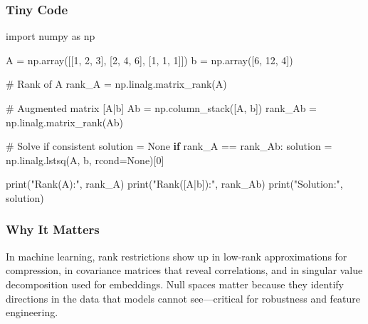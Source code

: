 \documentclass[
  letterpaper,
  DIV=11,
  numbers=noendperiod]{scrreprt}
\newenvironment{Shaded}{\begin{snugshade}}{\end{snugshade}}
\newcommand{\BuiltInTok}[1]{\textcolor[rgb]{0.00,0.23,0.31}{#1}}
\newcommand{\CommentTok}[1]{\textcolor[rgb]{0.37,0.37,0.37}{#1}}
\newcommand{\ControlFlowTok}[1]{\textcolor[rgb]{0.00,0.23,0.31}{\textbf{#1}}}
\newcommand{\DecValTok}[1]{\textcolor[rgb]{0.68,0.00,0.00}{#1}}
\newcommand{\ImportTok}[1]{\textcolor[rgb]{0.00,0.46,0.62}{#1}}
\newcommand{\NormalTok}[1]{\textcolor[rgb]{0.00,0.23,0.31}{#1}}
\newcommand{\OperatorTok}[1]{\textcolor[rgb]{0.37,0.37,0.37}{#1}}
\newcommand{\StringTok}[1]{\textcolor[rgb]{0.13,0.47,0.30}{#1}}
\newcommand{\VariableTok}[1]{\textcolor[rgb]{0.07,0.07,0.07}{#1}}
\begin{document}
\subsubsection{Tiny Code}\label{tiny-code-104}

\begin{Shaded}
\begin{Highlighting}[]
\ImportTok{import}\NormalTok{ numpy }\ImportTok{as}\NormalTok{ np}

\NormalTok{A }\OperatorTok{=}\NormalTok{ np.array([[}\DecValTok{1}\NormalTok{, }\DecValTok{2}\NormalTok{, }\DecValTok{3}\NormalTok{],}
\NormalTok{              [}\DecValTok{2}\NormalTok{, }\DecValTok{4}\NormalTok{, }\DecValTok{6}\NormalTok{],}
\NormalTok{              [}\DecValTok{1}\NormalTok{, }\DecValTok{1}\NormalTok{, }\DecValTok{1}\NormalTok{]])}
\NormalTok{b }\OperatorTok{=}\NormalTok{ np.array([}\DecValTok{6}\NormalTok{, }\DecValTok{12}\NormalTok{, }\DecValTok{4}\NormalTok{])}

\CommentTok{\# Rank of A}
\NormalTok{rank\_A }\OperatorTok{=}\NormalTok{ np.linalg.matrix\_rank(A)}

\CommentTok{\# Augmented matrix [A|b]}
\NormalTok{Ab }\OperatorTok{=}\NormalTok{ np.column\_stack([A, b])}
\NormalTok{rank\_Ab }\OperatorTok{=}\NormalTok{ np.linalg.matrix\_rank(Ab)}

\CommentTok{\# Solve if consistent}
\NormalTok{solution }\OperatorTok{=} \VariableTok{None}
\ControlFlowTok{if}\NormalTok{ rank\_A }\OperatorTok{==}\NormalTok{ rank\_Ab:}
\NormalTok{    solution }\OperatorTok{=}\NormalTok{ np.linalg.lstsq(A, b, rcond}\OperatorTok{=}\VariableTok{None}\NormalTok{)[}\DecValTok{0}\NormalTok{]}

\BuiltInTok{print}\NormalTok{(}\StringTok{"Rank(A):"}\NormalTok{, rank\_A)}
\BuiltInTok{print}\NormalTok{(}\StringTok{"Rank([A|b]):"}\NormalTok{, rank\_Ab)}
\BuiltInTok{print}\NormalTok{(}\StringTok{"Solution:"}\NormalTok{, solution)}
\end{Highlighting}
\end{Shaded}

\subsubsection{Why It Matters}\label{why-it-matters-2}

In machine learning, rank restrictions show up in low-rank
approximations for compression, in covariance matrices that reveal
correlations, and in singular value decomposition used for embeddings.
Null spaces matter because they identify directions in the data that
models cannot see---critical for robustness and feature engineering.
\end{document}
